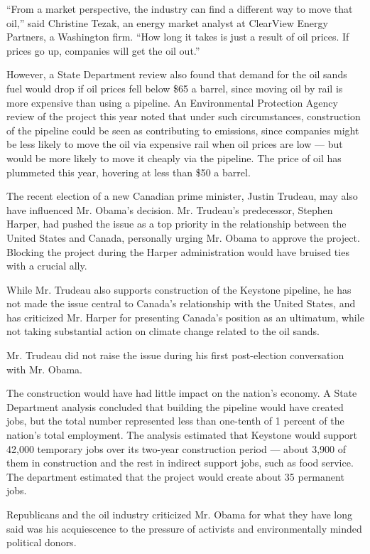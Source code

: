``From a market perspective, the industry can find a different way to
move that oil,'' said Christine Tezak, an energy market analyst at
ClearView Energy Partners, a Washington firm. ``How long it takes is
just a result of oil prices. If prices go up, companies will get the oil
out.''

However, a State Department review also found that demand for the oil
sands fuel would drop if oil prices fell below \$65 a barrel, since
moving oil by rail is more expensive than using a pipeline. An
Environmental Protection Agency review of the project this year noted
that under such circumstances, construction of the pipeline could be
seen as contributing to emissions, since companies might be less likely
to move the oil via expensive rail when oil prices are low --- but would
be more likely to move it cheaply via the pipeline. The price of oil has
plummeted this year, hovering at less than \$50 a barrel.

The recent election of a new Canadian prime minister, Justin Trudeau,
may also have influenced Mr. Obama's decision. Mr. Trudeau's
predecessor, Stephen Harper, had pushed the issue as a top priority in
the relationship between the United States and Canada, personally urging
Mr. Obama to approve the project. Blocking the project during the Harper
administration would have bruised ties with a crucial ally.

While Mr. Trudeau also supports construction of the Keystone pipeline,
he has not made the issue central to Canada's relationship with the
United States, and has criticized Mr. Harper for presenting Canada's
position as an ultimatum, while not taking substantial action on climate
change related to the oil sands.

Mr. Trudeau did not raise the issue during his first post-election
conversation with Mr. Obama.

The construction would have had little impact on the nation's economy. A
State Department analysis concluded that building the pipeline would
have created jobs, but the total number represented less than one-tenth
of 1 percent of the nation's total employment. The analysis estimated
that Keystone would support 42,000 temporary jobs over its two-year
construction period --- about 3,900 of them in construction and the rest
in indirect support jobs, such as food service. The department estimated
that the project would create about 35 permanent jobs.

Republicans and the oil industry criticized Mr. Obama for what they have
long said was his acquiescence to the pressure of activists and
environmentally minded political donors.

